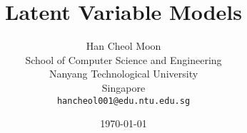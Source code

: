 \documentclass[oneside, a4paper,11pt]{book}
\begin{document}
\author{%
	Han Cheol Moon\\
	School of Computer Science and Engineering\\
	Nanyang Technological University\\
	Singapore\\
	\texttt{hancheol001@edu.ntu.edu.sg}
}
\title{Latent Variable Models}
\date{\today}

\frontmatter
\maketitle
\tableofcontents
\newpage

\mainmatter






\backmatter

\nocite{*}


\end{document}
